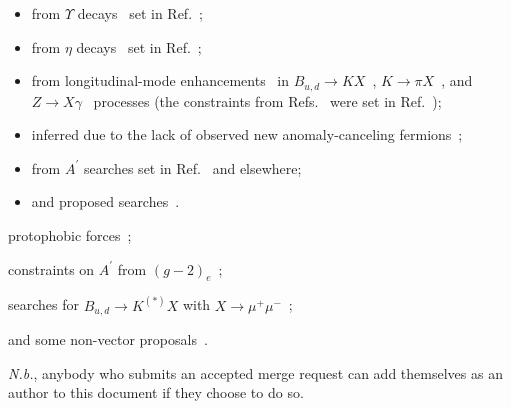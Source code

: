 \documentclass[a4paper,11pt]{article}
\def\aprime{\ensuremath{A^{\prime}}\xspace}
\begin{document}
\begin{list}{--}{\leftmargin=1em}
  \begin{itemize}
    \item from $\Upsilon$ decays~\cite{Albrecht:1986ec} set in Ref.~\cite{Aranda:1998fr};
    \item from $\eta$ decays~\cite{Prakhov:2008zz} set in Ref.~\cite{Tulin:2014tya};
    \item from longitudinal-mode enhancements~\cite{Dror:2017ehi,Dror:2017nsg} in $B_{u,d}\to KX$~\cite{Grygier:2017tzo,Aaij:2015tna,Aaij:2016qsm}, $K\to\pi X$~\cite{AlaviHarati:2003mr,Artamonov:2008qb}, and $Z\to X\gamma$~\cite{Acciarri:1997im,Abreu:1996pa} processes (the constraints from Refs.~\cite{Aaij:2015tna,Aaij:2016qsm} were set in Ref.~\cite{Ilten:2018dly});
    \item inferred due to the lack of observed new anomaly-canceling fermions~\cite{Dobrescu:2014fca};
    \item from \aprime searches set in Ref.~\cite{Ilten:2018dly} and elsewhere;
    \item and proposed searches~\cite{Fanelli:2016utb}.
  \end{itemize}
  \item protophobic forces~\cite{Feng:2016ysn};
  \item constraints on \aprime from $(g-2)_e$~\cite{Pospelov:2008zw,Endo:2012hp};
  \item searches for $B_{u,d} \to K^{(*)}X$ with $X\to\mu^+\mu^-$~\cite{Aaij:2015tna,Aaij:2016qsm};
  \item and some non-vector proposals~\cite{Kahn:2016vjr,Haisch:2016hzu}.
\end{list}
{\em N.b.}, anybody who submits an accepted merge request can add themselves as an author to this document if they choose to do so. 



\end{document}
